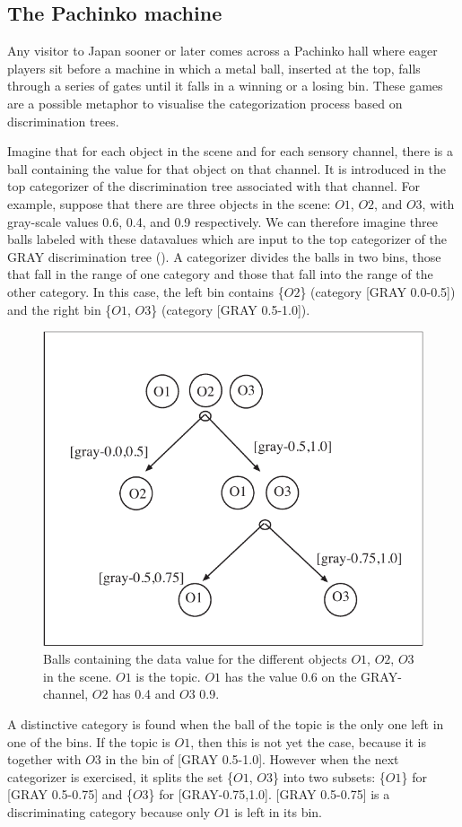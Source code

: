 \subsection{The Pachinko machine}

Any visitor to Japan sooner or later comes across a 
Pachinko hall where eager players sit before a 
machine in which a metal ball, inserted at the top, 
falls through a series of gates until it falls in 
a winning or a losing bin. These games are
a possible metaphor to visualise the categorization process
based on discrimination trees. 

Imagine that for each object in
the scene and for each sensory channel, there is a ball
containing the value for that object on that channel. It
is introduced in the top categorizer of the 
discrimination tree associated with that channel. 
For example, suppose that there are three
objects in the scene: $O1$, $O2$, and $O3$, 
with gray-scale values 0.6, 0.4, and 0.9 respectively. 
We can therefore imagine three balls labeled with these datavalues
which are input to the top categorizer of the 
GRAY discrimination tree (). 
A categorizer divides the balls in two bins, 
those that fall in the range of 
one category and those that fall into the range of the other
category. In this case, the left bin contains \{$O2$\} 
(category [GRAY 0.0-0.5]) 
and the right bin \{$O1$, $O3$\} (category [GRAY 0.5-1.0]). 
\begin{figure}[htbp]
  \centerline{\includegraphics[width=.65\textwidth]{chap4/figs/balls}}
\caption{\footnotesize \label{balls} Balls containing
the data value for the different objects
$O1$, $O2$, $O3$ in the scene. $O1$ is the topic.
$O1$ has the value 0.6 on the GRAY-channel, $O2$ has
0.4 and $O3$ 0.9.} 
\end{figure}

A distinctive category is found when the ball of the 
topic is the only one left in one of the bins. 
If the topic is $O1$, then this is not yet the 
case, because it is together with $O3$ in the 
bin of [GRAY 0.5-1.0]. However when the next categorizer
is exercised, it splits the set \{$O1$, $O3$\} 
into two subsets: \{$O1$\} for [GRAY 0.5-0.75]
and \{$O3$\} for [GRAY-0.75,1.0]. 
[GRAY 0.5-0.75] is a discriminating category because only 
$O1$ is left in its bin. 

